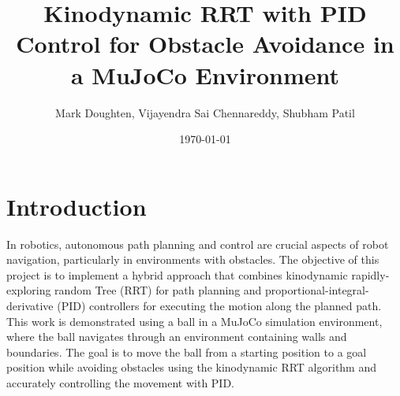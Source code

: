 \documentclass[12pt]{article}
\title{Kinodynamic RRT with PID Control for Obstacle Avoidance in a MuJoCo Environment}
\author{Mark Doughten, Vijayendra Sai Chennareddy, Shubham Patil}
\date{\today}
\begin{document}
\maketitle

\section{Introduction}
In robotics, autonomous path planning and control are crucial aspects of robot navigation, particularly in environments with obstacles. The objective of this project is to implement a hybrid approach that combines kinodynamic rapidly-exploring random Tree (RRT) for path planning and proportional-integral-derivative (PID) controllers for executing the motion along the planned path. This work is demonstrated using a ball in a MuJoCo simulation environment, where the ball navigates through an environment containing walls and boundaries. The goal is to move the ball from a starting position to a goal position while avoiding obstacles using the kinodynamic RRT algorithm and accurately controlling the movement with PID.
\end{document}
